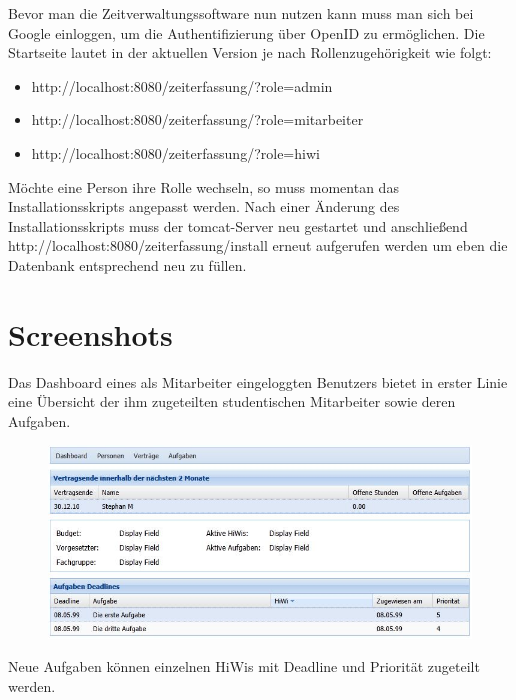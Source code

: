 \documentclass[article,colorback,accentcolor=tud2c]{tudreport}
\begin{document}
Bevor man die Zeitverwaltungssoftware nun nutzen kann muss man sich bei Google einloggen, um die Authentifizierung über OpenID zu ermöglichen. Die Startseite lautet in der aktuellen Version je nach Rollenzugehörigkeit wie folgt:
\begin{itemize}
\item http://localhost:8080/zeiterfassung/?role=admin
\item http://localhost:8080/zeiterfassung/?role=mitarbeiter
\item http://localhost:8080/zeiterfassung/?role=hiwi
\end{itemize}

Möchte eine Person ihre Rolle wechseln, so muss momentan das Installationsskripts angepasst werden. Nach einer Änderung des Installationsskripts muss der tomcat-Server neu gestartet und anschließend http://localhost:8080/zeiterfassung/install erneut aufgerufen werden um eben die Datenbank entsprechend neu zu füllen.


\section{Screenshots} %
\label{sec:screenshots}

Das Dashboard eines als Mitarbeiter eingeloggten Benutzers bietet in erster Linie eine Übersicht der ihm zugeteilten studentischen Mitarbeiter sowie deren Aufgaben.

\begin{figure}[h]
    \begin{center}
        \includegraphics[scale=0.8]{img/mitarbeiter-dashboard}
    \end{center}
\end{figure}

\newpage

Neue Aufgaben können einzelnen HiWis mit Deadline und Priorität zugeteilt werden.
\end{document}
